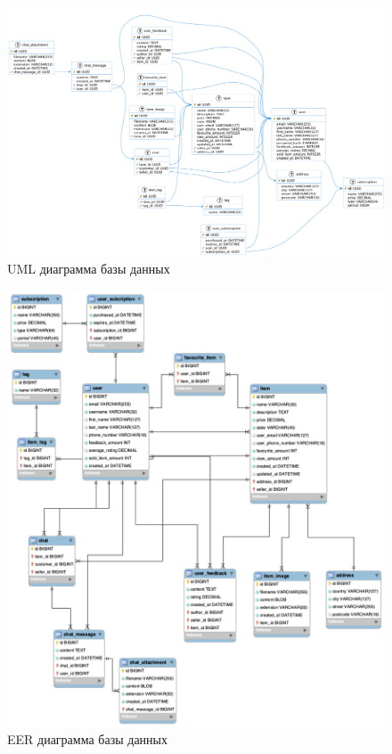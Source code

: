 \documentclass[a4paper,14pt]{extarticle}
\begin{document}
\begin{figure}[H]
    \centering
    \includegraphics[width=\textwidth]{images/db.png}
    \caption{UML диаграмма базы данных}
    \label{fig:uml-db}
\end{figure}

\begin{figure}[H]
    \centering
    \includegraphics[width=\textwidth]{images/eer.png}
    \caption{EER диаграмма базы данных}
    \label{fig:eer-db}
\end{figure}
\end{document}
